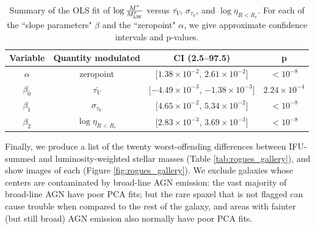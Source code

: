 \begin{table}
    \centering
    \begin{tabular}{||c|c|c|c||} \hline
        Variable & Quantity modulated & CI (2.5--97.5) & p \\ \hline \hline
        $\alpha$ & zeropoint & [$1.38 \times 10^{-2}$, $2.61 \times 10^{-2}$] & $< 10^{-8}$ \\ \hline
        $\beta_0$ & $\bar{\tau_V}$ & [$-4.49 \times 10^{-3}$, $-1.38 \times 10^{-3}$] & $2.24 \times 10^{-4}$ \\ \hline
        $\beta_1$ & $\sigma_{\tau_V}$ & [$4.65 \times 10^{-2}$, $5.34 \times 10^{-2}$] & $< 10^{-8}$ \\ \hline
        $\beta_2$ & $\log \eta_{R < R_e}$ & [$2.83 \times 10^{-3}$, $3.69 \times 10^{-3}$] & $< 10^{-8}$ \\ \hline
    \end{tabular}
    \caption[Linear first between stacking-induced mass deficit and dust \& SFR]{\fixspacing Summary of the OLS fit of $\log \frac{M^*}{M^*_{\rm LW}}$ versus $\bar{\tau_V}$, $\sigma_{\tau_V}$, and $\log \eta_{R < R_e}$. For each of the ``slope parameters" $\beta$ and the ``zeropoint" $\alpha$, we give approximate confidence intervals and p-values.}
    \label{tab:m_lumwtd_regression_summary}
\end{table}

Finally, we produce a list of the twenty worst-offending differences between IFU-summed and luminosity-weighted stellar masses (Table \ref{tab:rogues_gallery}), and show images of each (Figure \ref{fig:rogues_gallery}). We exclude galaxies whose centers are contaminated by broad-line AGN emission: the vast majority of broad-line AGN have poor PCA fits; but the rare spaxel that is not flagged can cause trouble when compared to the rest of the galaxy, and areas with fainter (but still broad) AGN emission also normally have poor PCA fits.

